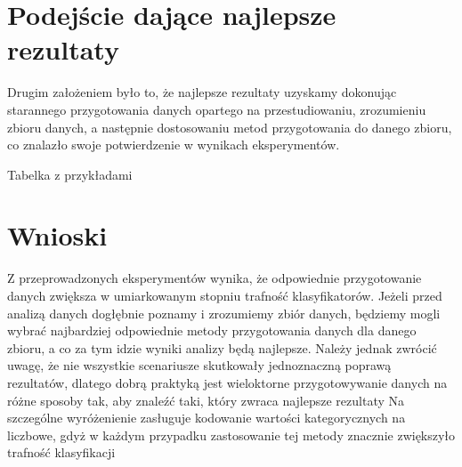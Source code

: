 \documentclass{book}
\begin{document}
\section{Podejście dające najlepsze rezultaty}

Drugim założeniem było to, że najlepsze rezultaty 
uzyskamy dokonując starannego przygotowania danych
opartego na przestudiowaniu, zrozumieniu zbioru danych, 
a następnie dostosowaniu metod przygotowania do 
danego zbioru, co znalazło swoje potwierdzenie w wynikach eksperymentów.

Tabelka z przykładami

\section{Wnioski}

Z przeprowadzonych eksperymentów wynika, 
że odpowiednie przygotowanie danych zwiększa w umiarkowanym stopniu trafność 
klasyfikatorów. Jeżeli przed analizą danych dogłębnie poznamy i zrozumiemy zbiór danych,
będziemy mogli wybrać najbardziej odpowiednie metody przygotowania danych dla danego zbioru,
a co za tym idzie wyniki analizy będą najlepsze.
Należy jednak zwrócić uwagę, że nie wszystkie 
scenariusze skutkowały jednoznaczną poprawą rezultatów, dlatego dobrą praktyką jest
wieloktorne przygotowywanie danych na różne sposoby tak, aby znaleźć taki, który zwraca najlepsze rezultaty 
Na szczególne wyróżenienie zasługuje kodowanie wartości 
kategorycznych na liczbowe, gdyż w każdym przypadku zastosowanie 
tej metody znacznie zwiększyło trafność klasyfikacji
\end{document}
